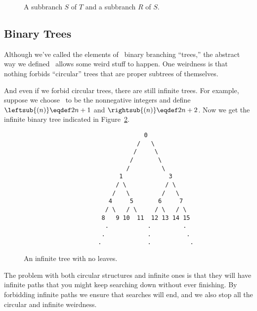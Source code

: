 \begin{definition}
\begin{figure}
\caption{A subbranch $S$ of $T$ and  a subbranch $R$ of $S$.}

\label{PQdown}

\end{figure}

\subsection{Binary Trees}
Although we've called the elements of \brnch\ binary branching
``trees,'' the abstract way we defined \brnch\ allows some weird stuff
to happen.  One weirdness is that nothing forbids ``circular'' trees
that are proper subtrees of themselves.
\iffalse
For example, it is entirely
possible that there is a structure $T \in \brnch$ such that
\textcolor{red}{
\[
\leftsub{(T)} = T = \rightsub{(T)}.
\]}

This weird binary branching structure doesn't even have any leaves.
\fi
And even if we forbid circular trees, there are still infinite
trees.  For example, suppose we choose \brnch\ to be the nonnegative
integers and define $\leftsub{(n)} \eqdef 2n+1$ and $\rightsub{(n)} \eqdef
2n+2$.  Now we get the infinite binary tree indicated in
Figure~\ref{inftree123}.


\begin{figure}


\begin{verbatim}
                                  0
                                /   \
                               /     \
                              /       \
                             /         \
                           1             3
                          / \           / \
                         /   \         /   \
                        4     5       6     7
                       / \   / \     / \   / \
                      8   9 10  11  12 13 14 15
                       .           .         . 
                      .            .          .
                     .             .           . 
\end{verbatim}

\caption{An infinite tree with no leaves.}                            

\label{inftree123}                                                   

\end{figure}

The problem with both circular structures and infinite ones is that
they will have infinite paths that you might keep searching down
without ever finishing.  By forbidding infinite paths we ensure that
searches will end, and we also stop all the circular and infinite
weirdness.


\end{definition}
